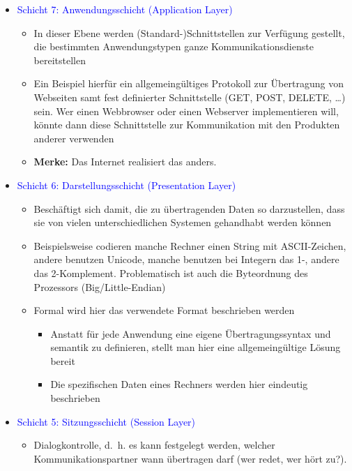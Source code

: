 \begin{itemize}
    \item \textcolor{blue}{Schicht 7: Anwendungsschicht (Application Layer)}
    \begin{itemize}
        \item In dieser Ebene werden (Standard-)Schnittstellen zur Verfügung gestellt, die bestimmten Anwendungstypen ganze Kommunikationsdienste bereitstellen
        \item Ein Beispiel hierfür ein allgemeingültiges Protokoll zur Übertragung von Webseiten samt fest definierter Schnittstelle (GET, POST, DELETE, …) sein.
        Wer einen Webbrowser oder einen Webserver implementieren will, könnte dann diese Schnittstelle zur Kommunikation mit den Produkten anderer verwenden
        \item \textbf{Merke:} Das Internet realisiert das anders.
    \end{itemize}
    \item \textcolor{blue}{Schicht 6: Darstellungsschicht (Presentation Layer)}
    \begin{itemize}
        \item Beschäftigt sich damit, die zu übertragenden Daten so darzustellen, dass sie von vielen unterschiedlichen Systemen gehandhabt werden können
        \item Beispielsweise codieren manche Rechner einen String mit ASCII-Zeichen, andere benutzen Unicode, manche benutzen bei Integern das 1-, andere das 2-Komplement.
        Problematisch ist auch die Byteordnung des Prozessors (Big/Little-Endian)
        \item Formal wird hier das verwendete Format beschrieben werden
        \begin{itemize}
            \item Anstatt für jede Anwendung eine eigene Übertragungssyntax und \-semantik zu definieren,
            stellt man hier eine allgemeingültige Lösung bereit
            \item Die spezifischen Daten eines Rechners werden hier eindeutig beschrieben
        \end{itemize}
    \end{itemize}
    \item \textcolor{blue}{Schicht 5: Sitzungsschicht (Session Layer)}
    \begin{itemize}
        \item Dialogkontrolle, d.\ h. es kann festgelegt werden, welcher Kommunikationspartner wann übertragen darf (wer redet, wer hört zu?).

\end{itemize}
\end{itemize}
